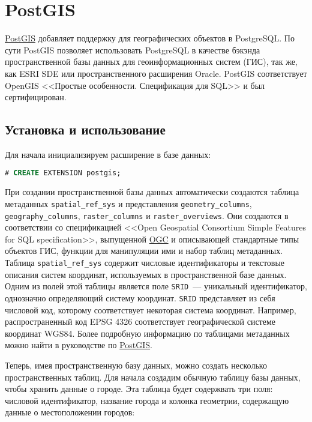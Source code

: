 \section{PostGIS}

\href{http://www.postgis.org/}{PostGIS} добавляет поддержку для географических объектов в PostgreSQL. По сути PostGIS позволяет использовать PostgreSQL в качестве бэкэнда пространственной базы данных для геоинформационных систем (ГИС), так же, как ESRI SDE или пространственного расширения Oracle. PostGIS соответствует OpenGIS <<Простые особенности. Спецификация для SQL>> и был сертифицирован.

\subsection{Установка и использование}

Для начала инициализируем расширение в базе данных:

\begin{lstlisting}[language=SQL,label=lst:postgisinit,caption=Инициализация postgis]
# CREATE EXTENSION postgis;
\end{lstlisting}

При создании пространственной базы данных автоматически создаются таблица метаданных \lstinline!spatial_ref_sys! и представления \lstinline!geometry_columns!, \lstinline!geography_columns!, \lstinline!raster_columns! и \lstinline!raster_overviews!. Они создаются в соответствии со спецификацией <<Open Geospatial Consortium Simple Features for SQL specification>>, выпущенной \href{http://www.opengeospatial.org/}{OGC} и описывающей стандартные типы объектов ГИС, функции для манипуляции ими и набор таблиц метаданных. Таблица \lstinline!spatial_ref_sys! содержит числовые идентификаторы и текстовые описания систем координат, используемых в пространственной базе данных. Одним из полей этой таблицы является поле \lstinline!SRID!~--- уникальный идентификатор, однозначно определяющий систему координат. \lstinline!SRID! представляет из себя числовой код, которому соответствует некоторая система координат. Например, распространенный код EPSG 4326 соответствует географической системе координат WGS84. Более подробную информацию по таблицами метаданных можно найти в руководстве по \href{http://postgis.net/docs/manual-2.3/using_postgis_dbmanagement.html#spatial_ref_sys}{PostGIS}.

Теперь, имея пространственную базу данных, можно создать несколько пространственных таблиц. Для начала создадим обычную таблицу базы данных, чтобы хранить данные о городе. Эта таблица будет содержвать три поля: числовой идентификатор, название города и колонка геометрии, содержащую данные о местоположении городов:

